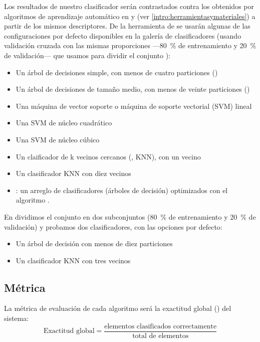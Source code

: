 Los resultados de nuestro clasificador serán contrastados contra los obtenidos por algoritmos de aprendizaje automático en  y  (ver \ref{intro:herramientasymateriales}) a partir de los mismos descriptores. De la herramienta de  se usarán algunas de las configuraciones por defecto disponibles en la galería de clasificadores (usando validación cruzada con las mismas proporciones ---\SI{80}{\percent} de entrenamiento y \SI{20}{\percent} de validación--- que usamos para dividir el conjunto ):
%
\begin{itemize}
\item Un árbol de decisiones simple, con menos de cuatro particiones ()
\item Un árbol de decisiones de tamaño medio, con menos de veinte particiones ()
\item Una máquina de vector soporte o máquina de soporte vectorial (SVM) lineal
\item Una SVM de núcleo cuadrático
\item Una SVM de núcleo cúbico
\item Un claificador de k vecinos cercanos (, KNN), con un vecino
\item Un clasificador KNN con diez vecinos
\item {}: un arreglo de clasificadores (árboles de decisión) optimizados con el algoritmo .
\end{itemize}

En  dividimos el conjunto  en dos subconjuntos (\SI{80}{\percent} de entrenamiento y \SI{20}{\percent} de validación) y probamos dos clasificadores, con las opciones por defecto:
%
\begin{itemize}
\item Un árbol de decisión con menos de diez particiones
\item Un clasificador KNN con tres vecinos
\end{itemize}




\subsection{Métrica}
La métrica de evaluación de cada algoritmo será la exactitud global () del sistema:
%
\begin{equation} \text{Exactitud global} = \frac{\text{elementos clasificados correctamente}}{\text{total de elementos}} \end{equation}


